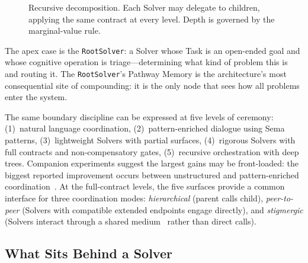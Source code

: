 \documentclass[11pt]{article}
\let\oldtexttt\texttt
\renewcommand{\texttt}[1]{\oldtexttt{\small #1}}
\begin{document}
\begin{figure}[htbp]
\centering
{}
\caption{Recursive decomposition. Each Solver may delegate to children, applying the same contract at every level. Depth is governed by the marginal-value rule.}
\label{fig:recursive}
\end{figure}

The apex case is the \texttt{RootSolver}: a Solver whose Task is an open-ended goal and whose cognitive operation is triage---determining what kind of problem this is and routing it. The \texttt{RootSolver}'s Pathway Memory is the architecture's most consequential site of compounding: it is the only node that sees how all problems enter the system.

The same boundary discipline can be expressed at five levels of ceremony\label{sec:scale}: (1)~natural language coordination, (2)~pattern-enriched dialogue using Sema patterns, (3)~lightweight Solvers with partial surfaces, (4)~rigorous Solvers with full contracts and non-compensatory gates, (5)~recursive orchestration with deep trees. Companion experiments suggest the largest gains may be front-loaded: the biggest reported improvement occurs between unstructured and pattern-enriched coordination~\cite{westerberg2026sema}. At the full-contract levels, the five surfaces provide a common interface for three coordination modes: \emph{hierarchical} (parent calls child), \emph{peer-to-peer} (Solvers with compatible extended endpoints engage directly), and \emph{stigmergic} (Solvers interact through a shared medium~\cite{westerberg2026understanding} rather than direct calls).

\subsection{What Sits Behind a Solver}
\label{sec:behind-solver}
\end{document}
